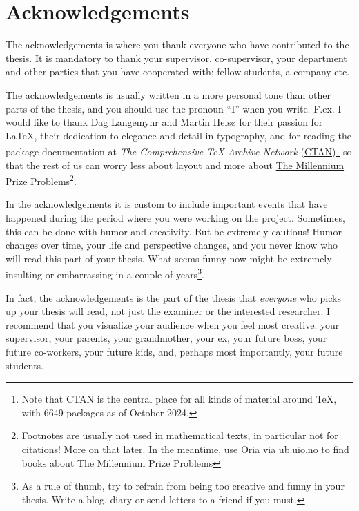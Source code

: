 \chapter*{Acknowledgements}\label{chapter:ack}
\markboth{}{} %
The acknowledgements is where you thank everyone who have contributed to the thesis. It is mandatory to thank your supervisor, co-supervisor, your department and other parties that you have cooperated with; fellow students, a company etc.  

The acknowledgements is usually written in a more personal tone than other parts of the thesis, and you should use the pronoun \enquote{I} when you write. F.ex. I would like to thank Dag Langemyhr and Martin Helsø for their passion for \LaTeX, their dedication to elegance and detail in typography, and for reading the package documentation at \emph{The Comprehensive TeX Archive Network} (\hyperlink{https://www.ctan.org/}{CTAN})\footnote{Note that CTAN is the central place for all kinds of material around TeX, with 6649 packages as of October 2024.} so that the rest of us can worry less about layout and more about \hyperlink{https://en.wikipedia.org/wiki/Millennium_Prize_Problems}{The Millennium Prize Problems}\footnote{Footnotes are usually not used in mathematical texts, in particular not for citations! More on that later. In the meantime, use Oria via \hyperlink{https://ub.uio.no}{ub.uio.no} to find books about The Millennium Prize Problems}.

In the acknowledgements it is custom to include important events that have happened during the period where you were working on the project. Sometimes, this can be done with humor and creativity. But be extremely cautious! Humor changes over time, your life and perspective changes, and you never know who will read this part of your thesis. What seems funny now might be extremely insulting or embarrassing in a couple of years\footnote{As a rule of thumb, try to refrain from being too creative and funny in your thesis. Write a blog, diary or send letters to a friend if you must.}.

In fact, the acknowledgements is the part of the thesis that \emph{everyone} who picks up your thesis will read, not just the examiner or the interested researcher. I recommend that you visualize your audience when you feel most creative: your supervisor, your parents, your grandmother, your ex, your future boss, your future co-workers, your future kids, and, perhaps most importantly, your future students.

